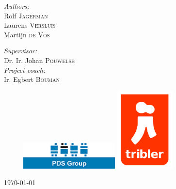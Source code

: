 \begin{titlepage}
\begin{center}
\begin{minipage}{0.4\textwidth}
\begin{flushleft} \large
\emph{Authors:}\\
Rolf \textsc{Jagerman} \\ [0.1cm]
Laurens \textsc{Versluis} \\ [0.1cm]
Martijn \textsc{de Vos} \\ [0.1cm]
\end{flushleft}
\end{minipage}
\begin{minipage}{0.4\textwidth}
\begin{flushright} \large
\emph{Supervisor:} \\
Dr. Ir. Johan \textsc{Pouwelse}\\
\emph{Project coach:} \\
Ir. Egbert \textsc{Bouman}
\end{flushright}
\end{minipage}
\vspace{30mm}
\begin{figure}[ht!]
\centering
\includegraphics[width=50mm]{graphics/pdslogo.png}
\hspace{10mm}
\includegraphics[width=30mm]{graphics/triblerlogo.png}
\label{overflow}
\end{figure}
\vfill

{\large \today}

\end{center}

\end{titlepage}